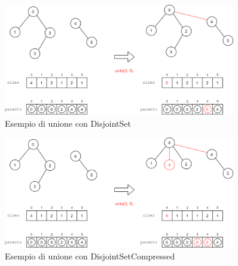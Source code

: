 \begin{figure}[h]
	\centering
	\includegraphics[width=0.9\textwidth]{./images/DisjointSetExample.png}
	\caption{Esempio di unione con DisjointSet}
	\label{fig:disjoint-set-union-example}
\end{figure}

\begin{figure}[h]
	\centering
	\includegraphics[width=0.9\textwidth]{./images/DisjointSetCompressedExample.png}
	\caption{Esempio di unione con DisjointSetCompressed}
	\label{fig:disjoint-set-compressed-union-example}
\end{figure}